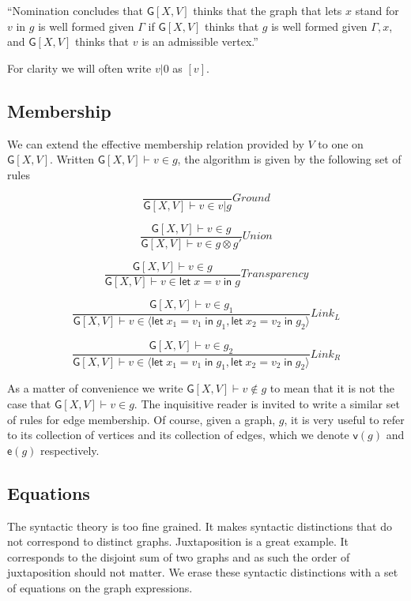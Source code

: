\documentclass[12pt]{llncs}
\begin{document}
``Nomination concludes that \(\mathsf{G}[X,V]\) thinks that the graph
that lets \(x\) stand for \(v\) in \(g\) is well formed given \(\Gamma\)
if \(\mathsf{G}[X,V]\) thinks that \(g\) is well formed given
\(\Gamma,x\), and \(\mathsf{G}[X,V]\) thinks that \(v\) is an admissible
vertex.''

For clarity we will often write \(v|0\) as \([v]\).

\hypertarget{membership}{%
\subsection{Membership}\label{membership}}

We can extend the effective membership relation provided by \(V\) to one
on \(\mathsf{G}[X,V]\). Written \(\mathsf{G}[X,V] \vdash v \in g\), the
algorithm is given by the following set of rules

\[\frac{ }{ \mathsf{G}[X,V] \vdash v \in v | g}Ground\]

\[\frac{ \mathsf{G}[X,V] \vdash v \in g }{ \mathsf{G}[X,V] \vdash v \in g \otimes g'}Union\]

\[\frac{ \mathsf{G}[X,V] \vdash v \in g }{ \mathsf{G}[X,V] \vdash v \in \mathsf{let}\; x = v \; \mathsf{in}\; g}Transparency\]

\[\frac{ \mathsf{G}[X,V] \vdash v \in g_1 }{ \mathsf{G}[X,V] \vdash v \in \langle\mathsf{let}\; x_1 = v_1 \; \mathsf{in}\; g_1, \mathsf{let}\; x_2 = v_2 \; \mathsf{in}\; g_2\rangle}Link_L\]

\[\frac{ \mathsf{G}[X,V] \vdash v \in g_2 }{ \mathsf{G}[X,V] \vdash v \in \langle\mathsf{let}\; x_1 = v_1 \; \mathsf{in}\; g_1, \mathsf{let}\; x_2 = v_2 \; \mathsf{in}\; g_2\rangle}Link_R\]

As a matter of convenience we write
\(\mathsf{G}[X,V] \vdash v \not\in g\) to mean that it is not the case
that \(\mathsf{G}[X,V] \vdash v \in g\). The inquisitive reader is
invited to write a similar set of rules for edge membership. Of course,
given a graph, \(g\), it is very useful to refer to its collection of
vertices and its collection of edges, which we denote \(\mathsf{v}(g)\)
and \(\mathsf{e}(g)\) respectively.

\hypertarget{equations}{%
\subsection{Equations}\label{equations}}

The syntactic theory is too fine grained. It makes syntactic
distinctions that do not correspond to distinct graphs. Juxtaposition is
a great example. It corresponds to the disjoint sum of two graphs and as
such the order of juxtaposition should not matter. We erase these
syntactic distinctions with a set of equations on the graph expressions.
\end{document}
